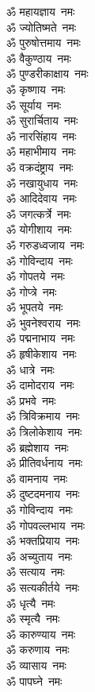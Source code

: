 \begin{multicols}{2}
\begin{flushleft}
ॐ महायज्ञाय~नमः\\
ॐ ज्योतिष्मते~नमः\\
ॐ पुरुषोत्तमाय~नमः\\
ॐ वैकुण्ठाय~नमः\\
ॐ पुण्डरीकाक्षाय~नमः\\
ॐ कृष्णाय~नमः\hfill{}\\
ॐ सूर्याय~नमः\\
ॐ सुरार्चिताय~नमः\\
ॐ नारसिंहाय~नमः\\
ॐ महाभीमाय~नमः\\
ॐ वक्रदंष्ट्राय~नमः\\
ॐ नखायुधाय~नमः\\
ॐ आदिदेवाय~नमः\\
ॐ जगत्कर्त्रे~नमः\\
ॐ योगीशाय~नमः\\
ॐ गरुडध्वजाय~नमः\hfill{}\\
ॐ गोविन्दाय~नमः\\
ॐ गोपतये~नमः\\
ॐ गोप्त्रे~नमः\\
ॐ भूपतये~नमः\\
ॐ भुवनेश्वराय~नमः\\
ॐ पद्मनाभाय~नमः\\
ॐ हृषीकेशाय~नमः\\
ॐ धात्रे~नमः\\
ॐ दामोदराय~नमः\\
ॐ प्रभवे~नमः\hfill{}\\
ॐ त्रिविक्रमाय~नमः\\
ॐ त्रिलोकेशाय~नमः\\
ॐ ब्रह्मेशाय~नमः\\
ॐ प्रीतिवर्धनाय~नमः\\
ॐ वामनाय~नमः\\
ॐ दुष्टदमनाय~नमः\\
ॐ गोविन्दाय~नमः\\
ॐ गोपवल्लभाय~नमः\\
ॐ भक्तप्रियाय~नमः\\
ॐ अच्युताय~नमः\hfill{}\\
ॐ सत्याय~नमः\\
ॐ सत्यकीर्तये~नमः\\
ॐ धृत्यै~नमः\\
ॐ स्मृत्यै~नमः\\
ॐ कारुण्याय~नमः\\
ॐ करुणाय~नमः\\
ॐ व्यासाय~नमः\\
ॐ पापघ्ने~नमः\\

\end{flushleft}
\end{multicols}
